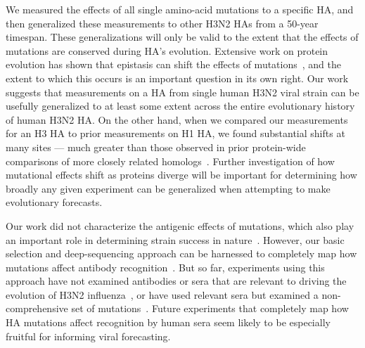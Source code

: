 \documentclass[9pt,twocolumn,twoside]{pnas-new}
\begin{document}
We measured the effects of all single amino-acid mutations to a specific HA, and then generalized these measurements to other H3N2 HAs from a 50-year timespan.
These generalizations will only be valid to the extent that the effects of mutations are conserved during HA's evolution.
Extensive work on protein evolution has shown that epistasis can shift the effects of mutations~\cite{gong2013stability,natarajan2013epistasis,harms2014historical,starr2016epistasis,starr2017alternative,haddox2018mapping}, and the extent to which this occurs is an important question in its own right.
Our work suggests that measurements on a HA from single human H3N2 viral strain can be usefully generalized to at least some extent across the entire evolutionary history of human H3N2 HA.
On the other hand, when we compared our measurements for an H3 HA to prior measurements on H1 HA, we found substantial shifts at many sites --- much greater than those observed in prior protein-wide comparisons of more closely related homologs~\cite{doud2015site,haddox2018mapping}.
Further investigation of how mutational effects shift as proteins diverge will be important for determining how broadly any given experiment can be generalized when attempting to make evolutionary forecasts.

Our work did not characterize the antigenic effects of mutations, which also play an important role in determining strain success in nature~\cite{koel2013substitutions,neher2016prediction}.
However, our basic selection and deep-sequencing approach can be harnessed to completely map how mutations affect antibody recognition~\cite{doud2017complete,doud2018quantifying}.
But so far, experiments using this approach have not examined antibodies or sera that are relevant to driving the evolution of H3N2 influenza~\cite{doud2017complete,doud2018quantifying}, or have used relevant sera but examined a non-comprehensive set of mutations~\cite{li2016selection}.
Future experiments that completely map how HA mutations affect recognition by human sera seem likely to be especially fruitful for informing viral forecasting.
\end{document}
